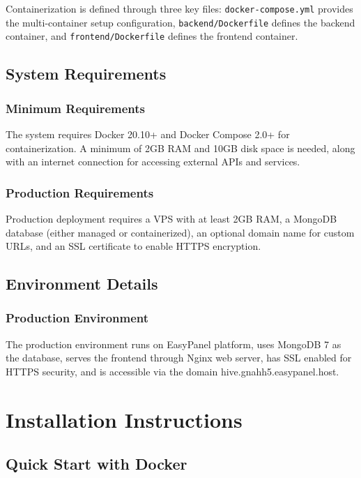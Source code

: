 \documentclass[12pt,a4paper]{report}
\begin{document}
Containerization is defined through three key files: \texttt{docker-compose.yml} provides the multi-container setup configuration, \texttt{backend/Dockerfile} defines the backend container, and \texttt{frontend/Dockerfile} defines the frontend container.

\section{System Requirements}

\subsection{Minimum Requirements}

The system requires Docker 20.10+ and Docker Compose 2.0+ for containerization. A minimum of 2GB RAM and 10GB disk space is needed, along with an internet connection for accessing external APIs and services.

\subsection{Production Requirements}

Production deployment requires a VPS with at least 2GB RAM, a MongoDB database (either managed or containerized), an optional domain name for custom URLs, and an SSL certificate to enable HTTPS encryption.

\section{Environment Details}

\subsection{Production Environment}

The production environment runs on EasyPanel platform, uses MongoDB 7 as the database, serves the frontend through Nginx web server, has SSL enabled for HTTPS security, and is accessible via the domain hive.gnahh5.easypanel.host.

\chapter{Installation Instructions}

\section{Quick Start with Docker}
\end{document}
